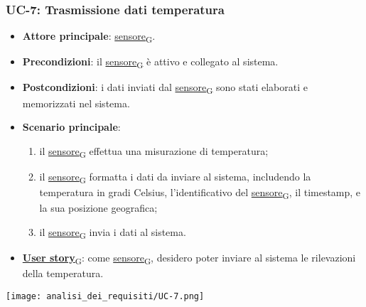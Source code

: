 \subsubsection{UC-7: Trasmissione dati temperatura}
\begin{itemize}
	\item \textbf{Attore principale}: \href{https://7last.github.io/docs/pb/documentazione-interna/glossario\#sensore}{sensore\textsubscript{G}}.
	\item \textbf{Precondizioni}: il \href{https://7last.github.io/docs/pb/documentazione-interna/glossario\#sensore}{sensore\textsubscript{G}} è attivo e collegato al sistema.
	\item \textbf{Postcondizioni}: i dati inviati dal \href{https://7last.github.io/docs/pb/documentazione-interna/glossario\#sensore}{sensore\textsubscript{G}} sono stati elaborati e memorizzati nel sistema.
	\item \textbf{Scenario principale}:
	      \begin{enumerate}
		      \item il \href{https://7last.github.io/docs/pb/documentazione-interna/glossario\#sensore}{sensore\textsubscript{G}} effettua una misurazione di temperatura;
		      \item il \href{https://7last.github.io/docs/pb/documentazione-interna/glossario\#sensore}{sensore\textsubscript{G}} formatta i dati da inviare al sistema, includendo la temperatura in gradi Celsius, l'identificativo del \href{https://7last.github.io/docs/pb/documentazione-interna/glossario\#sensore}{sensore\textsubscript{G}},
		            il timestamp, e la sua posizione geografica;
		      \item il \href{https://7last.github.io/docs/pb/documentazione-interna/glossario\#sensore}{sensore\textsubscript{G}} invia i dati al sistema.
	      \end{enumerate}
	\item \href{https://7last.github.io/docs/pb/documentazione-interna/glossario\#user-story}{\textbf{User story}\textsubscript{G}}: come \href{https://7last.github.io/docs/pb/documentazione-interna/glossario\#sensore}{sensore\textsubscript{G}}, desidero poter inviare al sistema le rilevazioni della temperatura.
\end{itemize}

\begin{center}
	\texttt{[image: analisi\_dei\_requisiti/UC-7.png]}
\end{center}

